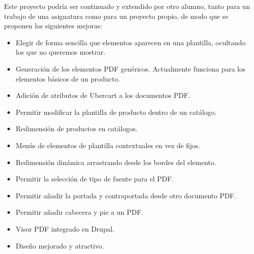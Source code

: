 Este proyecto podría ser continuado y extendido por otro alumno, tanto para un trabajo de una asignatura como para un proyecto propio, de modo que se proponen las siguientes mejoras:
\begin{itemize}
	\item Elegir de forma sencilla que elementos aparecen en una plantilla, ocultando los que no queremos mostrar.
	\item Generación de los elementos PDF genéricos. Actualmente funciona para los elementos básicos de un producto.
	\item Adición de atributos de Ubercart a los documentos PDF. 
	\item Permitir modificar la plantilla de producto dentro de un catálogo.
	\item Redimensión de productos en catálogos.
	\item Menús de elementos de plantilla contextuales en vez de fijos.
	\item Redimensión dinámica arrastrando desde los bordes del elemento.
	\item Permitir la selección de tipo de fuente para el PDF.
	\item Permitir añadir la portada y contraportada desde otro documento PDF.
	\item Permitir añadir cabecera y pie a un PDF.
	\item Visor PDF integrado en Drupal.
	\item Diseño mejorado y atractivo.
\end{itemize}